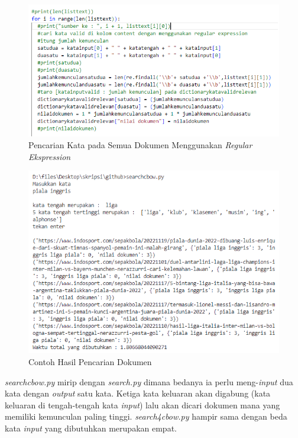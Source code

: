 \documentclass[12pt]{report}
\begin{document}
\begin{figure}[H]
\centering
\includegraphics[scale=0.75]{pencarian_dengan_regex}
\caption{Pencarian Kata pada Semua Dokumen Menggunakan \textit{Regular Ekspression}}
\label{pencarian_dengan_regex}
\end{figure}

\begin{figure}[H]
\centering
\includegraphics[scale=0.75]{contoh_hasil_pencarian}
\caption{Contoh Hasil Pencarian Dokumen}
\label{contohhasilpencarian}
\end{figure}

\textit{searchcbow.py} mirip dengan \textit{search.py} dimana bedanya ia perlu meng-\textit{input} dua kata dengan \textit{output} satu kata. Ketiga kata keluaran akan digabung (kata keluaran di tengah-tengah kata \textit{input}) lalu akan dicari dokumen mana yang memiliki kemunculan paling tinggi. \textit{search4cbow.py} hampir sama dengan beda kata \textit{input} yang dibutuhkan merupakan empat.
\end{document}
